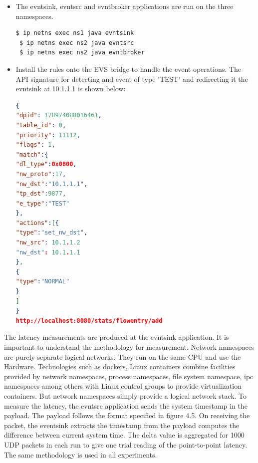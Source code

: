 \begin{itemize}
 \item The evntsink, evntsrc and evntbroker applications are run on the three namespaces.
 \begin{lstlisting}[language=bash]
 $ ip netns exec ns1 java evntsink
 $ ip netns exec ns2 java evntsrc
 $ ip netns exec ns2 java evntbroker \end{lstlisting}
\end{itemize}

\begin{itemize}
 \item Install the rules onto the EVS bridge to handle the event operations. The API signature for detecting and event of type 'TEST' and redirecting it the evntsink at 10.1.1.1 is shown below:
\begin{lstlisting}[language=json,firstnumber=1]
 {
"dpid": 178974088016461,
"table_id": 0,
"priority": 11112,
"flags": 1,
"match":{
"dl_type":0x0800,
"nw_proto":17,
"nw_dst":"10.1.1.1",
"tp_dst":9877,
"e_type":"TEST"
},
"actions":[{
"type":"set_nw_dst",
"nw_src": 10.1.1.2
"nw_dst": 10.1.1.1
},
{
"type":"NORMAL"
}
]
}
http://localhost:8080/stats/flowentry/add \end{lstlisting}
\end{itemize}

The latency measurements are produced at the evntsink application. It is important to understand the methodology for measurement. Network namespaces are purely separate logical networks. They run on the same CPU and use the Hardware. Technologies such as dockers, Linux containers combine facilities provided by network namespaces, process namespaces, file system namespace, \ac{ipc} namespaces among others with Linux control groups to provide virtualization containers. But network namespaces simply provide a logical network stack. To measure the latency, the evntsrc application sends the system timestamp in the payload. The payload follows the format specified in figure 4.5. On receiving the packet, the eventsink extracts the timestamp from the payload computes the difference between current system time. The delta value is aggregated for 1000 UDP packets in each run to give one trial reading of the point-to-point latency. The same methodology is used in all experiments.

